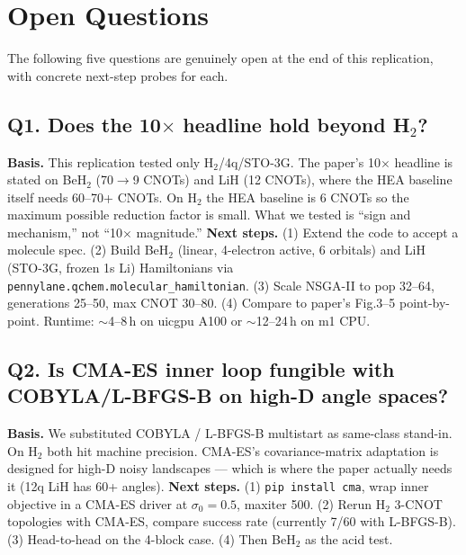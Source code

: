\section{Open Questions}

The following five questions are genuinely open at the end of this replication, with
concrete next-step probes for each.

\subsection*{Q1. Does the 10$\times$ headline hold beyond H$_2$?}
\textbf{Basis.} This replication tested only H$_2$/4q/STO-3G. The paper's 10$\times$
headline is stated on BeH$_2$ (70$\to$9 CNOTs) and LiH (12 CNOTs), where the HEA baseline
itself needs 60--70+ CNOTs. On H$_2$ the HEA baseline is 6 CNOTs so the maximum possible
reduction factor is small. What we tested is ``sign and mechanism,'' not ``10$\times$ magnitude.''
\textbf{Next steps.} (1) Extend the code to accept a molecule spec. (2) Build BeH$_2$
(linear, 4-electron active, 6 orbitals) and LiH (STO-3G, frozen 1s Li) Hamiltonians via
\texttt{pennylane.qchem.molecular\_hamiltonian}. (3) Scale NSGA-II to pop 32--64, generations
25--50, max CNOT 30--80. (4) Compare to paper's Fig.3--5 point-by-point.
Runtime: $\sim$4--8\,h on uicgpu A100 or $\sim$12--24\,h on m1 CPU.

\subsection*{Q2. Is CMA-ES inner loop fungible with COBYLA/L-BFGS-B on high-D angle spaces?}
\textbf{Basis.} We substituted COBYLA / L-BFGS-B multistart as same-class stand-in. On H$_2$
both hit machine precision. CMA-ES's covariance-matrix adaptation is designed for high-D
noisy landscapes --- which is where the paper actually needs it (12q LiH has 60+ angles).
\textbf{Next steps.} (1) \texttt{pip install cma}, wrap inner objective in a CMA-ES driver
at $\sigma_0=0.5$, maxiter 500. (2) Rerun H$_2$ 3-CNOT topologies with CMA-ES, compare
success rate (currently 7/60 with L-BFGS-B). (3) Head-to-head on the 4-block case. (4) Then
BeH$_2$ as the acid test.

